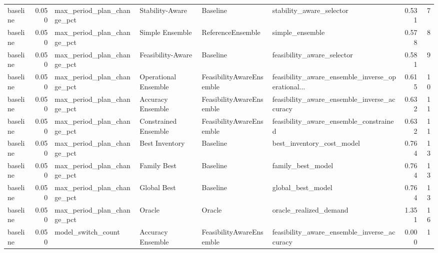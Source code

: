 \begin{table}
{\begin{tabular}{lrllllrr}
      baseline &             0.050 &  max\_period\_plan\_change\_pct &       Stability-Aware &                  Baseline &                           stability\_aware\_selector &         0.531 &               7 \\
      baseline &             0.050 &  max\_period\_plan\_change\_pct &       Simple Ensemble &         ReferenceEnsemble &                                    simple\_ensemble &         0.578 &               8 \\
      baseline &             0.050 &  max\_period\_plan\_change\_pct &     Feasibility-Aware &                  Baseline &                         feasibility\_aware\_selector &         0.581 &               9 \\
      baseline &             0.050 &  max\_period\_plan\_change\_pct &  Operational Ensemble &  FeasibilityAwareEnsemble &  feasibility\_aware\_ensemble\_inverse\_operational... &         0.615 &              10 \\
      baseline &             0.050 &  max\_period\_plan\_change\_pct &     Accuracy Ensemble &  FeasibilityAwareEnsemble &        feasibility\_aware\_ensemble\_inverse\_accuracy &         0.632 &              11 \\
      baseline &             0.050 &  max\_period\_plan\_change\_pct &  Constrained Ensemble &  FeasibilityAwareEnsemble &             feasibility\_aware\_ensemble\_constrained &         0.632 &              11 \\
      baseline &             0.050 &  max\_period\_plan\_change\_pct &        Best Inventory &                  Baseline &                          best\_inventory\_cost\_model &         0.764 &              13 \\
      baseline &             0.050 &  max\_period\_plan\_change\_pct &           Family Best &                  Baseline &                                  family\_best\_model &         0.764 &              13 \\
      baseline &             0.050 &  max\_period\_plan\_change\_pct &           Global Best &                  Baseline &                                  global\_best\_model &         0.764 &              13 \\
      baseline &             0.050 &  max\_period\_plan\_change\_pct &                Oracle &                    Oracle &                             oracle\_realized\_demand &         1.351 &              16 \\
      baseline &             0.050 &          model\_switch\_count &     Accuracy Ensemble &  FeasibilityAwareEnsemble &        feasibility\_aware\_ensemble\_inverse\_accuracy &         0.000 &               1 \\

\end{tabular}}
\end{table}
